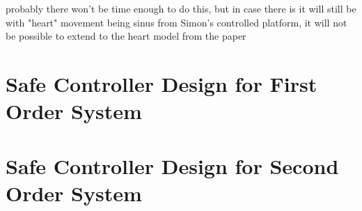 probably there won't be time enough to do this, but in case there is it will still be with "heart" movement being sinus from Simon's controlled platform, it will not be possible to extend to the heart model from the paper

\section{Safe Controller Design for First Order System}

\section{Safe Controller Design for Second Order System}